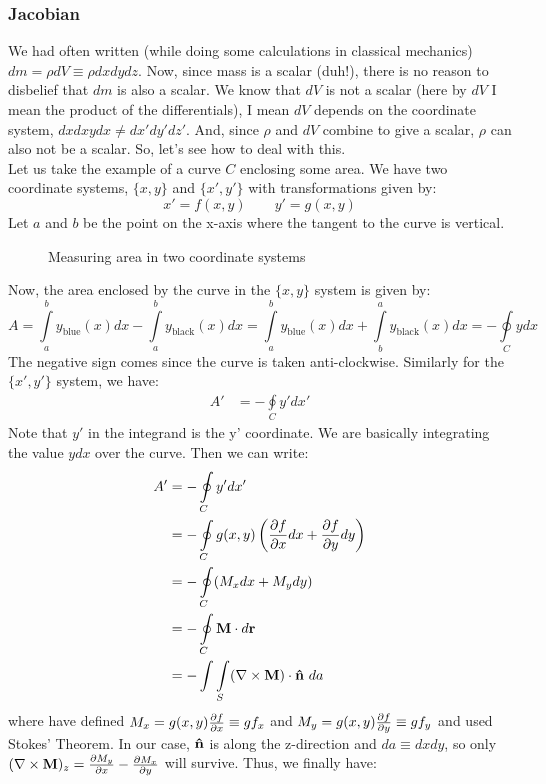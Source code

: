 \subsubsection{Jacobian}
We had often written (while doing some calculations in classical mechanics) $dm = \rho dV \equiv \rho dxdydz$. Now, since mass is a scalar (duh!), there is no reason to disbelief that $dm$ is also a scalar. We know that $dV$ is not a scalar (here by $dV$ I mean the product of the differentials), I mean $dV$ depends on the coordinate system, $dxdxydx \neq dx'dy'dz'$. And, since $\rho$ and $dV$ combine to give a scalar, $\rho$ can also not be a scalar. So, let's see how to deal with this.\\[0.3cm]
Let us take the example of a curve $C$ enclosing some area. We have two coordinate systems, $\{x,y\}$ and $\{x',y'\}$ with transformations given by:
$$x' = f(x,y)\quad\quad y'=g(x,y)$$ Let $a$ and $b$ be the point on the x-axis where the tangent to the curve is vertical. 
\begin{figure}[H]
    \centering
    
    \caption{Measuring area in two coordinate systems}
\end{figure}
\noindent
Now, the area enclosed by the curve in the $\{x,y\}$ system is given by:
$$A = \int\limits_a^b y_{\mathrm{blue}}(x) dx - \int\limits_a^b y_{\mathrm{black}}(x) dx = \int\limits_a^b y_{\mathrm{blue}}(x) dx + \int\limits_b^a y_{\mathrm{black}}(x) dx = -\oint\limits_{C}y dx$$ 
The negative sign comes since the curve is taken anti-clockwise. Similarly for the $\{x',y'\}$ system, we have:
\begin{align*}
    A' &= -\oint\limits_{C}y' dx' 
\end{align*}
Note that $y'$ in the integrand is the y' coordinate. We are basically integrating the value $ydx$ over the curve. Then we can write:
\begin{align*}
    A' &= -\oint\limits_{C}y' dx' \\
    &= -\oint\limits_{C}g(x,y)\left( \pdv{f}{x}dx+\pdv{f}{y}dy \right)\\
    &= -\oint\limits_{C}(M_xdx + M_ydy)\\
    &= -\oint\limits_{C} \boldsymbol{\mathbf{M}}\cdot d\boldsymbol{\mathbf{r}}\\
&= -\int\int\limits_S (\nabla\times \boldsymbol{\mathbf{M}})\cdot \boldsymbol{\mathbf{\hat{n}}}\ da
\end{align*}
where have defined $M_x = g(x,y)\pdv{f}{x}\equiv gf_x$ and $M_y = g(x,y)\pdv{f}{y}\equiv gf_y$ and used Stokes' Theorem.
In our case, $\boldsymbol{\mathbf{\hat{n}}}$ is along the z-direction and $da \equiv dxdy$, so only $(\nabla\times \boldsymbol{\mathbf{M}})_z = \pdv{M_y}{x}-\pdv{M_x}{y}$ will survive. Thus, we finally have:
